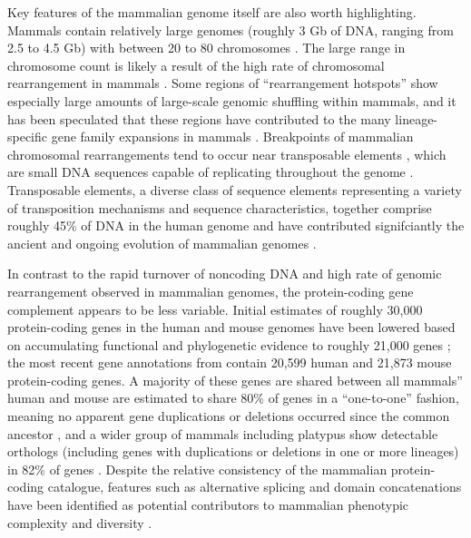 Key features of the mammalian genome itself are also worth
highlighting. Mammals contain relatively large genomes (roughly 3 Gb
of DNA, ranging from 2.5 to 4.5 Gb) with between 20 to 80 chromosomes
\citep{Bachmann1972}. The large range in chromosome count is likely a
result of the high rate of chromosomal rearrangement in mammals
\citep{Eichler2003,Pevzner2003}. Some regions of ``rearrangement
hotspots'' show especially large amounts of large-scale genomic
shuffling within mammals, and it has been speculated that these
regions have contributed to the many lineage-specific gene family
expansions in mammals \citep{Eichler2003}. Breakpoints of mammalian
chromosomal rearrangements tend to occur near transposable elements
\citep{Zhao2009}, which are small DNA sequences capable of replicating
throughout the genome \citep{Lander2001}. Transposable elements, a
diverse class of sequence elements representing a variety of
transposition mechanisms and sequence characteristics, together
comprise roughly 45\% of DNA in the human genome and have contributed
signifciantly the ancient and ongoing evolution of mammalian genomes
\citep{Lander2001,Cordaux2009}.

In contrast to the rapid turnover of noncoding DNA and high rate of
genomic rearrangement observed in mammalian genomes, the
protein-coding gene complement appears to be less variable. Initial
estimates of roughly 30,000 protein-coding
\citep{Lander2001,Mouse2002Initial} genes in the human and mouse
genomes have been lowered based on accumulating functional and
phylogenetic evidence to roughly 21,000 genes \citep{Macaque2007}; the
most recent gene annotations from \ens \citep{Flicek2011} contain
20,599 human and 21,873 mouse protein-coding genes. A majority of
these genes are shared between all mammals'' human and mouse are
estimated to share 80\% of genes in a ``one-to-one'' fashion, meaning
no apparent gene duplications or deletions occurred since the common
ancestor \citep{Mouse2002Initial}, and a wider group of mammals
including platypus show detectable orthologs (including genes with
duplications or deletions in one or more lineages) in 82\% of genes
\citep{Warren2008b}. Despite the relative consistency of the mammalian
protein-coding catalogue, features such as alternative splicing and
domain concatenations have been identified as potential contributors
to mammalian phenotypic complexity and diversity \citep{Lander2001}.

